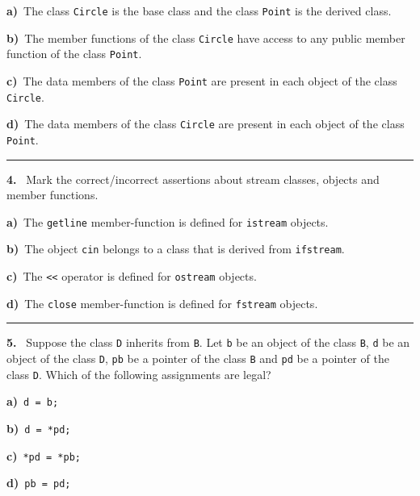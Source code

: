 \begin{multicols}{2}
{\bf a)}\ The class \verb|Circle| is the base class and the class \verb|Point| is the derived class.

{\bf b)}\ The member functions of the class \verb|Circle| have access to any public member function of the class \verb|Point|.

{\bf c)}\ The data members of the class \verb|Point| are present in each object of the class \verb|Circle|.

{\bf d)}\ The data members of the class \verb|Circle| are present in each object of the class \verb|Point|.

\par\smallskip\hrule\par\medskip

{\bf 4. }\ Mark the correct/incorrect assertions about stream classes, objects and
member functions.

{\bf a)}\ The \verb|getline| member-function is defined for \verb|istream| objects.

{\bf b)}\ The object \verb|cin| belongs to a class that is derived from \verb|ifstream|.

{\bf c)}\ The \verb|<<| operator is defined for \verb|ostream| objects.

{\bf d)}\ The \verb|close| member-function is defined for \verb|fstream| objects.

\par\smallskip\hrule\par\medskip

{\bf 5. }\ Suppose the class \verb|D| inherits from \verb|B|. Let
\verb|b| be an object of the class \verb|B|,
\verb|d| be an object of the class \verb|D|,
\verb|pb| be a pointer of the class \verb|B| and
\verb|pd| be a pointer of the class \verb|D|.
Which of the following assignments are legal?

{\bf a)}\ \verb|d = b;|

{\bf b)}\ \verb|d = *pd;|

{\bf c)}\ \verb|*pd = *pb;|

{\bf d)}\ \verb|pb = pd;|

\end{multicols}


